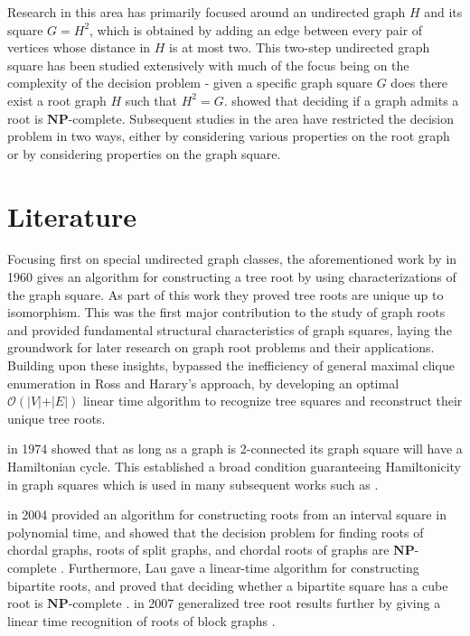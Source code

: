 \documentclass[11pt]{report}
\begin{document}
Research in this area has primarily focused around an undirected graph $H$ and its square $G = H^2$, which is obtained by adding an edge between every pair of vertices whose distance in $H$ is at most two. This two-step undirected graph square has been studied extensively with much of the focus being on the complexity of the decision problem - given a specific graph square $G$ does there exist a root graph $H$ such that $H^2=G$. \citeauthor{motwani_sudan_1994_roots} showed that deciding if a graph admits a root is $\mathbf{NP}$-complete. Subsequent studies in the area have restricted the decision problem in two ways, either by considering various properties on the root graph or by considering properties on the graph square. 

\section{Literature} \label{sec::literature}

Focusing first on special undirected graph classes, the aforementioned work by \citeauthor{ross_1960_square} in 1960 gives an algorithm for constructing a tree root by using characterizations of the graph square. As part of this work they proved tree roots are unique up to isomorphism. This was the first major contribution to the study of graph roots and provided fundamental structural characteristics of graph squares, laying the groundwork for later research on graph root problems and their applications. Building upon these insights, \citeauthor{lin_1995_square_roots} bypassed the inefficiency of general maximal clique enumeration in Ross and Harary's approach, by developing an optimal $\mathcal{O}(\vert{}V\vert{} + \vert{}E\vert{})$ linear time algorithm to recognize tree squares and reconstruct their unique tree roots\cite{lin_1995_square_roots}.

\citeauthor{fleischner_1974_square} in 1974 showed that as long as a graph is 2-connected its graph square will have a Hamiltonian cycle. This established a broad condition guaranteeing Hamiltonicity in graph squares which is used in many subsequent works such as \cite{brandt_muttel_rautenbach_2014}. 

\citeauthor{lau_corneil_2004_chordal_root} in 2004 provided an algorithm for constructing roots from an interval square in polynomial time, and showed that the decision problem for finding roots of chordal graphs, roots of split graphs, and chordal roots of graphs are $\mathbf{NP}$-complete \cite{lau_corneil_2004_chordal_root}. Furthermore, Lau gave a linear-time algorithm for constructing bipartite roots, and proved that deciding whether a bipartite square has a cube root is $\mathbf{NP}$-complete \cite{lau_2006_bipartite_roots}. \citeauthor{le_tuy_2007_block_square} in 2007 generalized tree root results further by giving a linear time recognition of roots of block graphs \cite{le_tuy_2007_block_square}. 
\end{document}

